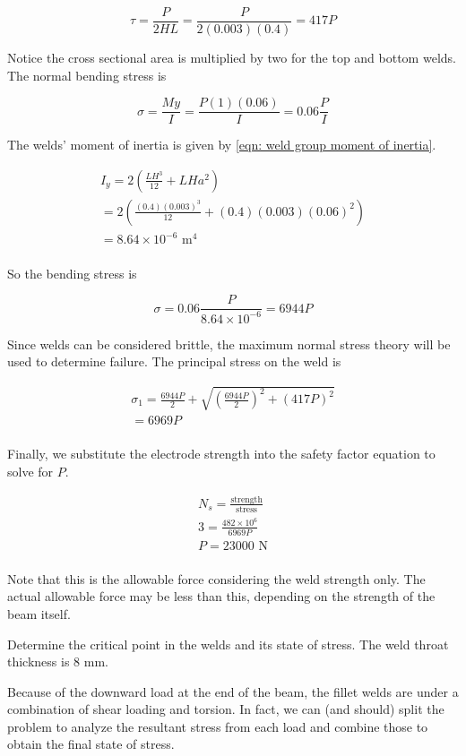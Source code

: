 \documentclass[a4paper,openany,12pt]{book}
\begin{document}
{{$$\tau  = \frac{P}{2HL} = \frac{P}{2(0.003)(0.4)} = 417P$$

Notice the cross sectional area is multiplied by two for the top and
bottom welds. The normal bending stress is

$$\sigma  = \frac{My}{I} = \frac{P(1)(0.06)}{I} = 0.06\frac{P}{I}$$

The welds' moment of inertia is given by
\ref{eqn: weld group moment of inertia}.

$$\begin{gathered}
      I_y = 2\left( \frac{LH^3}{12} + LHa^2 \right) \\ 
      = 2\left( \frac{(0.4)(0.003)^3}{12} + (0.4)(0.003)(0.06)^2 \right) \\ 
      = 8.64 \times 10^{-6} \text{ m}^4 \\ 
    \end{gathered}$$

So the bending stress is

$$\sigma  = 0.06\frac{P}{8.64 \times 10^{-6}} = 6944P$$

Since welds can be considered brittle, the maximum normal stress theory
will be used to determine failure. The principal stress on the weld is

$$\begin{gathered}
      \sigma _1 = \frac{6944P}{2} + \sqrt {\left( \frac{6944P}{2} \right)^2 + (417P)^2}  \\ 
      = 6969P \\ 
    \end{gathered}$$

Finally, we substitute the electrode strength into the safety factor
equation to solve for \(P\).

$$\begin{gathered}
      N_s = \frac{\text{strength}}{\text{stress}} \\ 
      3 = \frac{482 \times 10^6}{6969P} \\ 
      P = 23000 \text{ N} \\ 
    \end{gathered}$$

Note that this is the allowable force considering the weld strength
only. The actual allowable force may be less than this, depending on the
strength of the beam itself.

Determine the critical point in the welds and its state of stress. The
weld throat thickness is 8 mm.


Because of the downward load at the end of the beam, the fillet welds
are under a combination of shear loading and torsion. In fact, we can
(and should) split the problem to analyze the resultant stress from each
load and combine those to obtain the final state of stress.

}}
\end{document}
